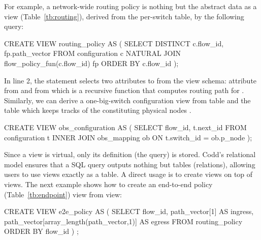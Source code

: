 For example, a network-wide routing policy is nothing but the abstract
data as a view (Table~\ref{tb:routing}), derived from the per-switch
 table, by the following query:
\begin{sql}
CREATE VIEW routing_policy AS (
  SELECT DISTINCT c.flow_id, fp.path_vector
  FROM configuration c 
       NATURAL JOIN flow_policy_fun(c.flow_id) fp
  ORDER BY c.flow_id );  
\end{sql}
In line 2, the  statement selects two attributes to from
the view schema: attribute  from  and
 from  which is a recursive
function that computes routing path for . 
Similarly, we can derive a one-big-switch configuration view from
 table and the  table which keeps
tracks of the constituting physical nodes .
\begin{sql}
CREATE VIEW obs_configuration AS (
  SELECT flow_id, t.next_id
  FROM   configuration t INNER JOIN obs_mapping ob
  ON     t.switch_id = ob.p_node );  
\end{sql}

Since a view is virtual, only its definition (the query) is stored.
Codd's relational model ensures that a SQL query outputs nothing but tables
(relations), allowing users to use views exactly as a table. A direct
usage is to create views on top of views. The next example shows how to
create an end-to-end policy (Table~\ref{tb:endpoint}) view from
 view:
\begin{sql}
CREATE VIEW e2e_policy AS (
 SELECT flow_id,
       path_vector[1] AS ingress,
       path_vector[array_length(path_vector,1)] AS egress
 FROM  routing_policy
 ORDER BY flow_id ) ;  
\end{sql}



